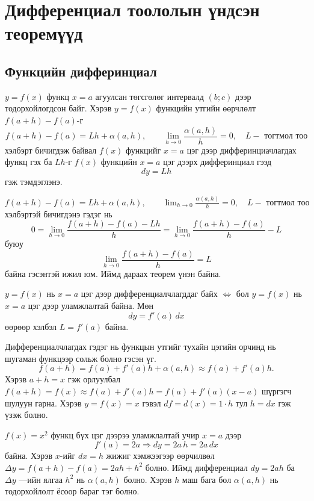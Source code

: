 \chapter{Дифференциал тоололын үндсэн теоремүүд}
\section{Функцийн дифферинциал}

\begin{definition}
$y=f(x)$ функц $x=a$ агуулсан төгсгөлөг интервалд $(b;c)$ дээр тодорхойлогдсон байг. Хэрэв $y=f(x)$ функцийн утгийн өөрчлөлт $f(a+h)-f(a)$-г $$f(a+h)-f(a)=Lh+\alpha(a,h), \qquad \lim_{h\to0}\frac{\alpha(a,h)}{h}=0 ,\quad L-\text{ тогтмол тоо}$$ хэлбэрт бичигдэж байвал $f(x)$ функцийг $x=a$ цэг дээр дифферинциачлагдах функц гэх ба $Lh$-г $f(x)$ функцийн $x=a$ цэг дээрх дифферинциал гээд $$dy=Lh$$ гэж тэмдэглэнэ.
\end{definition}
\begin{remark}
   $f(a+h)-f(a)=Lh+\alpha(a,h), \qquad \lim_{h\to0}\frac{\alpha(a,h)}{h}=0 ,\quad L-\text{ тогтмол тоо}$ хэлбэртэй бичигдэнэ гэдэг нь  
\[
0=\lim_{h\to0}\frac{f(a+h)-f(a)-Lh}{h}=\lim_{h\to0}\frac{f(a+h)-f(a)}{h}-L
\] буюу $$\lim_{h\to0}\frac{f(a+h)-f(a)}{h}=L$$ байна гэсэнтэй ижил юм. Иймд дараах теорем үнэн байна.
\end{remark}
\begin{theorem} \(y=f(x)\) нь \(x=a\) цэг дээр дифференциалчлагддаг байх $\Leftrightarrow$ бол \(y=f(x)\) нь \(x=a\) цэг дээр уламжлалтай байна. Мөн \[
dy = f'(a)\,dx
\]
  өөрөөр хэлбэл $L=f'(a)$ байна. 
\end{theorem}
\begin{remark}
  Дифференциалчлагдах гэдэг нь функцын утгийг тухайн цэгийн орчинд нь шугаман функцээр сольж болно гэсэн үг.
\[
f(a+h)=f(a)+f'(a)h+\alpha(a,h)\approx f(a)+f'(a)h.
\] Хэрэв $a+h=x$ гэж орлуулбал $f(a+h)=f(x)\approx f(a)+f'(a)h=f(a)+f'(a)(x-a)$
шүргэгч шулуун гарна. Хэрэв $y=f(x)=x$ гэвэл $df=d(x)=1\cdot h$ тул $h=dx$ гэж үзэж болно.
\end{remark}
\begin{example}
  \(f(x)=x^2\) функц бүх цэг дээрээ уламжлалтай учир \(x=a\) дээр
\[
f'(a)=2a\Rightarrow  dy = 2a\,h=2a \,dx
\] байна. 
Хэрэв \(x\)-ийг \(dx=h\)  жижиг хэмжээгээр өөрчилвөл \( \Delta y = f(a+h)-f(a)=2a h + h^2\) болно. Иймд дифференциал \(dy=2a h\) ба \( \Delta y \) —ийн ялгаа \(h^2\) нь $\alpha(a,h)$ болно. Хэрэв $h$ маш бага бол $\alpha(a,h)$ нь тодорхойлолт ёсоор бараг тэг болно.
\end{example} 
